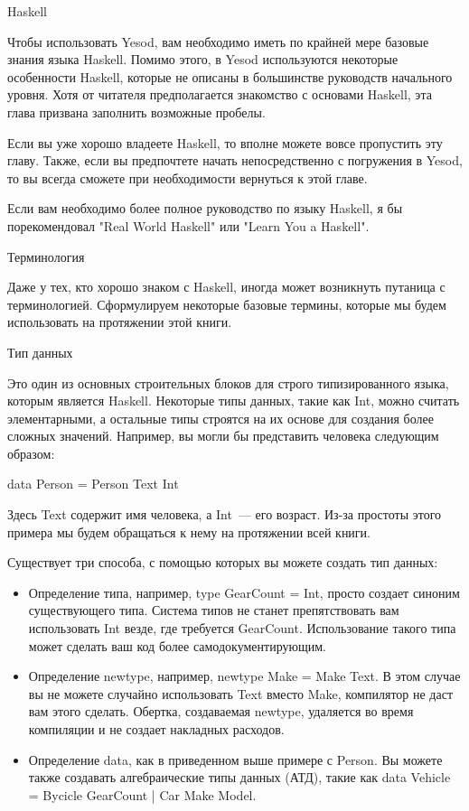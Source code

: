 Haskell

Чтобы использовать Yesod, вам необходимо иметь по крайней мере базовые знания языка Haskell. Помимо этого, в Yesod используются некоторые особенности Haskell, которые не описаны в большинстве руководств начального уровня. Хотя от читателя предполагается знакомство с основами Haskell, эта глава призвана заполнить возможные пробелы.

Если вы уже хорошо владеете Haskell, то вполне можете вовсе пропустить эту главу. Также, если вы предпочтете начать непосредственно с погружения в Yesod, то вы всегда сможете при необходимости вернуться к этой главе.

Если вам необходимо более полное руководство по языку Haskell, я бы порекомендовал "Real World Haskell" или "Learn You a Haskell".

Терминология

Даже у тех, кто хорошо знаком с Haskell, иногда может возникнуть путаница с терминологией. Сформулируем некоторые базовые термины, которые мы будем использовать на протяжении этой книги.

Тип данных

Это один из основных строительных блоков для строго типизированного языка, которым является Haskell. Некоторые типы данных, такие как Int, можно считать элементарными, а остальные типы строятся на их основе для создания более сложных значений. Например, вы могли бы представить человека следующим образом:

data Person = Person Text Int

Здесь Text содержит имя человека, а Int~--- его возраст. Из-за простоты этого примера мы будем обращаться к нему на протяжении всей книги.

Существует три способа, с помощью которых вы можете создать тип данных:

\begin{itemize}
  \item Определение типа, например, type GearCount = Int, просто создает синоним существующего типа. Система типов не станет препятствовать вам использовать Int везде, где требуется GearCount. Использование такого типа может сделать ваш код более самодокументирующим.
  \item Определение newtype, например, newtype Make = Make Text. В этом случае вы не можете случайно использовать Text вместо Make, компилятор не даст вам этого сделать. Обертка, создаваемая newtype, удаляется во время компиляции и не создает накладных расходов.
  \item Определение data, как в приведенном выше примере с Person. Вы можете также создавать алгебраические типы данных (АТД), такие как data Vehicle = Bycicle GearCount | Car Make Model.
\end{itemize}

